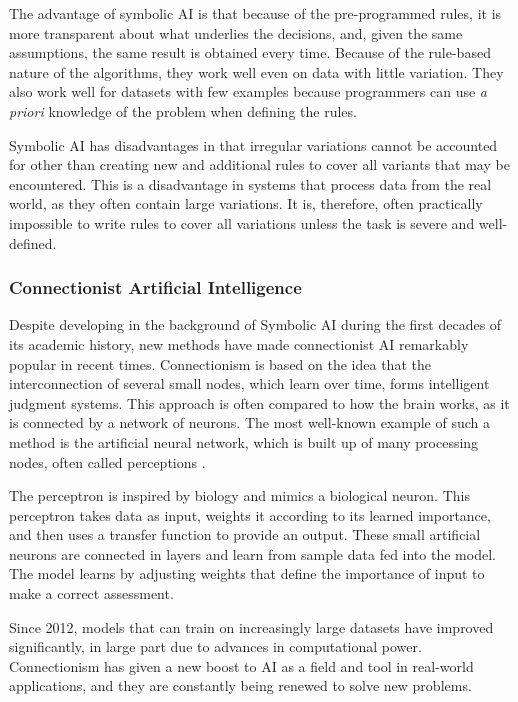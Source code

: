The advantage of symbolic AI is that because of the pre-programmed rules, it is more transparent about what underlies the decisions, and, given the same assumptions, the same result is obtained every time. Because of the rule-based nature of the algorithms, they work well even on data with little variation. They also work well for datasets with few examples because programmers can use \textit{a priori} knowledge of the problem when defining the rules.

Symbolic AI has disadvantages in that irregular variations cannot be accounted for other than creating new and additional rules to cover all variants that may be encountered. This is a disadvantage in systems that process data from the real world, as they often contain large variations. It is, therefore, often practically impossible to write rules to cover all variations unless the task is severe and well-defined.


\subsubsection{Connectionist Artificial Intelligence}
Despite developing in the background of Symbolic AI during the first decades of its academic history, new methods have made connectionist AI remarkably popular in recent times. Connectionism is based on the idea that the interconnection of several small nodes, which learn over time, forms intelligent judgment systems. This approach is often compared to how the brain works, as it is connected by a network of neurons. The most well-known example of such a method is the artificial neural network, which is built up of many processing nodes, often called perceptions \cite{mccullochLogicalCalculusIdeas1943}.

The perceptron is inspired by biology and mimics a biological neuron. This perceptron takes data as input, weights it according to its learned importance, and then uses a transfer function to provide an output. These small artificial neurons are connected in layers and learn from sample data fed into the model. The model learns by adjusting weights that define the importance of input to make a correct assessment.

Since 2012, models that can train on increasingly large datasets have improved significantly, in large part due to advances in computational power. Connectionism has given a new boost to AI as a field and tool in real-world applications, and they are constantly being renewed to solve new problems.

